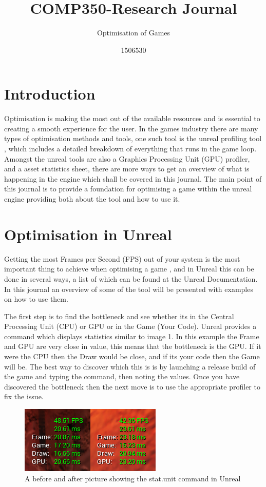 \documentclass{scrartcl}
\title{COMP350-Research Journal}
\subtitle{Optimisation of Games}
\author{1506530}
\begin{document}
	
	
	\maketitle
\section{Introduction}
Optimisation is making the most out of the available resources and is essential to creating a smooth experience for the user. In the games industry there are many types of optimisation methods and tools, one such tool is the unreal profiling tool \cite{UEPer}, which includes a detailed breakdown of everything that runs in the game loop. Amongst the unreal tools are also a Graphics Processing Unit (GPU) profiler, and a asset statistics sheet, there are more ways to get an overview of what is happening in the engine which shall be covered in this journal. The main point of this journal is to provide a foundation for optimising a game within the unreal engine providing both about the tool and how to use it.
	
\section{Optimisation in Unreal}
Getting the most Frames per Second (FPS) out of your system is the most important thing to achieve when optimising a game \cite{UEYouTube}, and in Unreal this can be done in several ways, a list of which can be found at the Unreal Documentation. In this journal an overview of some of the tool will be presented with examples on how to use them.

The first step is to find the bottleneck and see whether its in the Central Processing Unit (CPU) or GPU or in the Game (Your Code). Unreal provides a command  which displays statistics similar to image 1. In this example the Frame and GPU are very close in value, this means that the bottleneck is the GPU. If it were the CPU then the Draw would be close, and if its your code then the Game will be. The best way to discover which this is is by launching a release build of the game and typing the command, then noting the values. Once you have discovered the bottleneck then the next move is to use the appropriate profiler to fix the issue.

\begin{figure}[h]
	\centering
	\includegraphics{Image1}
	\caption{A before and after picture showing the stat.unit command in Unreal}
	\label{Image1}
\end{figure}
\end{document}
